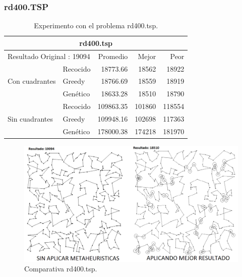 \subsubsection{rd400.TSP}
\begin{table}[hbtp]
 \centering 
    \caption{Experimento con el problema rd400.tsp.} 
	\begin{tabular}{ | l   l | r | r | r |   }
        \hline\multicolumn{5}{|c|}{ \rowcolor[gray]{0.8}rd400.tsp } \\\hline
         \multicolumn{2}{|l|}{Resultado Original : 19094} & Promedio & Mejor & Peor \\ \hline
                & Recocido  & 18773.66 & 18562 & 18922  \\ 
 Con cuadrantes & Greedy    & 18766.69 & 18559 & 18919  \\ 
                & Genético  & \cellcolor[gray]{0.9} 18633.28 & \cellcolor[gray]{0.9} 18510 & \cellcolor[gray]{0.9} 18790 \\ \hline
                & Recocido  & \cellcolor[gray]{0.9} 109863.35 & \cellcolor[gray]{0.9} 101860 & 118554   \\ 
 Sin cuadrantes & Greedy    & 109948.16 & 102698 & \cellcolor[gray]{0.9} 117363   \\ 
                & Genético  & 178000.38 & 174218 & 181970   \\ 
                \hline
    \end{tabular}
    \label{table:EXP_rd400.tsp}
\end{table}
\begin{figure}[hbtp]
    \centering
        \includegraphics[width=1\textwidth]{PruebasResultados/Experimentos_Comparativas/rd400.png}
        \caption{Comparativa rd400.tsp.}
        \label{fig:rd400_comparativa.png}
\end{figure}
